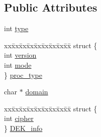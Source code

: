 \subsection*{Public Attributes}
\begin{DoxyCompactItemize}
\item 
int \hyperlink{structpem__ctx__st_aa68441b2d1bdccccc8b598a582b42793}{type}
\item 
\begin{tabbing}
xx\=xx\=xx\=xx\=xx\=xx\=xx\=xx\=xx\=\kill
struct \{\\
\>int \hyperlink{structpem__ctx__st_a027e55d6e36ad9a227aad7ad45400fab}{version}\\
\>int \hyperlink{structpem__ctx__st_afc2981103ba640bcac6f525a16f38a7d}{mode}\\
\} \hyperlink{structpem__ctx__st_a627eff176622d5ac0cb213a17ae3ce57}{proc\_type}\\

\end{tabbing}\item 
char $\ast$ \hyperlink{structpem__ctx__st_a626b9c364cf296248d6106e728923e45}{domain}
\item 
\begin{tabbing}
xx\=xx\=xx\=xx\=xx\=xx\=xx\=xx\=xx\=\kill
struct \{\\
\>int \hyperlink{structpem__ctx__st_a759a129c105dd59ab18162b07e81bbe1}{cipher}\\
\} \hyperlink{structpem__ctx__st_a0908736327c2fc226ffe1651a72d0ed8}{DEK\_info}\\


\end{tabbing}
\end{DoxyCompactItemize}
